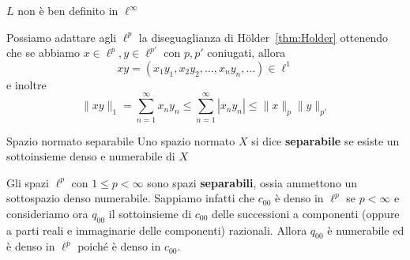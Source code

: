 \begin{remark}
    \(L\) non è ben definito in \(\ell^{\infty}\) 
\end{remark}

Possiamo adattare agli \(\ell^{p}\) la diseguaglianza di Hölder~\ref{thm:Holder}
ottenendo che se abbiamo \(x \in \ell^{p}, y \in \ell^{p'}\) con \(p, p'\)
coniugati, allora
\[
  xy = {(x_{1}y_{1}, x_{2}y_{2}, \dots, x_{n}y_{n}, \dots)} \in \ell^{1} 
\]
e inoltre
\[
  \|xy\|_1 = \sum_{n=1}^{\infty} x_{n}y_{n} \le \sum_{n=1}^{\infty} |x_{n}y_{n}| \le
  \|x\|_p \|y\|_{p'} 
\]
\begin{definition}[label=def:separabile]{Spazio normato separabile}
    Uno spazio normato \(X\) si dice \textbf{separabile} se esiste un sottoinsieme
    denso e numerabile di \(X\)
\end{definition}

Gli spazi \(\ell^{p}\) con \(1 \le p < \infty\) sono spazi \textbf{separabili},
ossia ammettono un sottospazio denso numerabile. Sappiamo infatti che \(c_{00}
\) è denso in \(\ell^{p}\) se \(p < \infty\) e consideriamo ora \(q_{00} \) il
sottoinsieme di \(c_{00}\) delle successioni a componenti (oppure a parti reali
e immaginarie delle componenti) razionali. Allora \(q_{00} \) è numerabile ed è
denso in \(\ell^{p}\) poiché è denso in \(c_{00}\).

